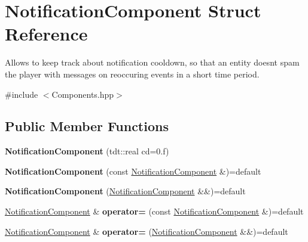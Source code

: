 \hypertarget{struct_notification_component}{}\section{Notification\+Component Struct Reference}
\label{struct_notification_component}


Allows to keep track about notification cooldown, so that an entity doesn\textquotesingle{}t spam the player with messages on reoccuring events in a short time period.  




{\ttfamily \#include $<$Components.\+hpp$>$}

\subsection*{Public Member Functions}
\begin{DoxyCompactItemize}
\item 
{\bfseries Notification\+Component} (tdt\+::real cd=0.f)\hypertarget{struct_notification_component_a61fe5bc08029f912e8d9750514feb10e}{}\label{struct_notification_component_a61fe5bc08029f912e8d9750514feb10e}

\item 
{\bfseries Notification\+Component} (const \hyperlink{struct_notification_component}{Notification\+Component} \&)=default\hypertarget{struct_notification_component_aa1a70a05af6e94956ae04495e93f50de}{}\label{struct_notification_component_aa1a70a05af6e94956ae04495e93f50de}

\item 
{\bfseries Notification\+Component} (\hyperlink{struct_notification_component}{Notification\+Component} \&\&)=default\hypertarget{struct_notification_component_ace3e34c0a180c7569a2c1b3d85313377}{}\label{struct_notification_component_ace3e34c0a180c7569a2c1b3d85313377}

\item 
\hyperlink{struct_notification_component}{Notification\+Component} \& {\bfseries operator=} (const \hyperlink{struct_notification_component}{Notification\+Component} \&)=default\hypertarget{struct_notification_component_add521cfd10be0b2ca8156f682048f25f}{}\label{struct_notification_component_add521cfd10be0b2ca8156f682048f25f}

\item 
\hyperlink{struct_notification_component}{Notification\+Component} \& {\bfseries operator=} (\hyperlink{struct_notification_component}{Notification\+Component} \&\&)=default\hypertarget{struct_notification_component_ae48f93cfc64db47efaa9111d7f7d5d45}{}\label{struct_notification_component_ae48f93cfc64db47efaa9111d7f7d5d45}

\end{DoxyCompactItemize}
